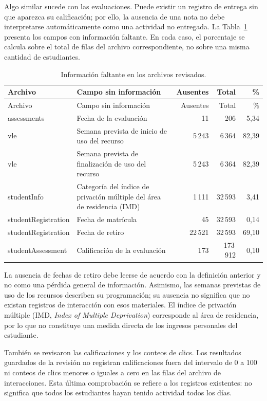 Algo similar sucede con las evaluaciones. Puede existir un registro de entrega sin que aparezca su calificación; por ello, la ausencia de una nota no debe interpretarse automáticamente como una actividad no entregada. La Tabla~\ref{rev01:faltantes} presenta los campos con información faltante. En cada caso, el porcentaje se calcula sobre el total de filas del archivo correspondiente, no sobre una misma cantidad de estudiantes.

\begingroup\small\setlength{\tabcolsep}{3pt}\renewcommand{\arraystretch}{1.16}
\begin{longtable}{p{.21\linewidth}p{.35\linewidth}r r r}
\caption{Información faltante en los archivos revisados.}\label{rev01:faltantes}\\
\toprule
Archivo & Campo sin información & Ausentes & Total & \% \\
\midrule\endfirsthead
Archivo & Campo sin información & Ausentes & Total & \% \\
\midrule\endhead
\bottomrule\endfoot
assessments & Fecha de la evaluación & 11 & 206 & 5,34 \\
vle & Semana prevista de inicio de uso del recurso & 5\,243 & 6\,364 & 82,39 \\
vle & Semana prevista de finalización de uso del recurso & 5\,243 & 6\,364 & 82,39 \\
studentInfo & Categoría del índice de privación múltiple del área de residencia (IMD) & 1\,111 & 32\,593 & 3,41 \\
studentRegistration & Fecha de matrícula & 45 & 32\,593 & 0,14 \\
studentRegistration & Fecha de retiro & 22\,521 & 32\,593 & 69,10 \\
studentAssessment & Calificación de la evaluación & 173 & 173\,912 & 0,10 \\
\end{longtable}\endgroup

La ausencia de fechas de retiro debe leerse de acuerdo con la definición anterior y no como una pérdida general de información. Asimismo, las semanas previstas de uso de los recursos describen su programación; su ausencia no significa que no existan registros de interacción con esos materiales. El índice de privación múltiple (IMD, \textit{Index of Multiple Deprivation}) corresponde al área de residencia, por lo que no constituye una medida directa de los ingresos personales del estudiante.

También se revisaron las calificaciones y los conteos de clics. Los resultados guardados de la revisión no registran calificaciones fuera del intervalo de 0 a 100 ni conteos de clics menores o iguales a cero en las filas del archivo de interacciones. Esta última comprobación se refiere a los registros existentes: no significa que todos los estudiantes hayan tenido actividad todos los días.

